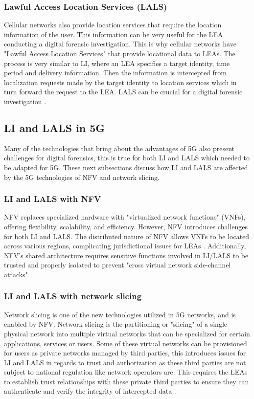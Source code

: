 \documentclass[final,1p,times,authoryear]{elsarticle}
\begin{document}
\subsubsection{Lawful Access Location Services (LALS)}
\label{sub2sub3sec2}
Cellular networks also provide location services that require the location information of the user. This information can be very useful for the LEA conducting a digital forensic investigation. This is why cellular networks have "Lawful Access Location Services" that provide locational data to LEAs. The process is very similar to LI, where an LEA specifies a target identity, time period and delivery information. Then the information is intercepted from localization requests made by the target identity to location services which in turn forward the request to the LEA. LALS can be crucial for a digital forensic investigation \citep{sharevski2018towards}.

\subsection{LI and LALS in 5G}
\label{sub2sec4}
Many of the technologies that bring about the advantages of 5G also present challenges for digital forensics, this is true for both LI and LALS which needed to be adapted for 5G. These next subsections discuss how LI and LALS are affected by the 5G technologies of NFV and network slicing.

\subsubsection{LI and LALS with NFV}
\label{sub2sub4sec1}
NFV replaces specialized hardware with "virtualized network functions" (VNFs), offering flexibility, scalability, and efficiency. However, NFV introduces challenges for both LI and LALS. The distributed nature of NFV allows VNFs to be located across various regions, complicating jurisdictional issues for LEAs \citep{sharevski2018towards}. Additionally, NFV's shared architecture requires sensitive functions involved in LI/LALS to be trusted and properly isolated to prevent "cross virtual network side-channel attacks" \citep{farahmandian2016security}.

\subsubsection{LI and LALS with network slicing}
\label{sub2sub4sec2}
Network slicing is one of the new technologies utilized in 5G networks, and is enabled by NFV. Network slicing is the partitioning or "slicing" of a single physical network into multiple virtual networks that can be specialized for certain applications, services or users\citep{zhang2019overview}. Some of these virtual networks can be provisioned for users as private networks managed by third parties, this introduces issues for LI and LALS in regards to trust and authorization as these third parties are not subject to national regulation like network operators are. This requires the LEAs to establish trust relationships with these private third parties to ensure they can authenticate and verify the integrity of intercepted data \citep{sharevski2018towards}.
\end{document}
